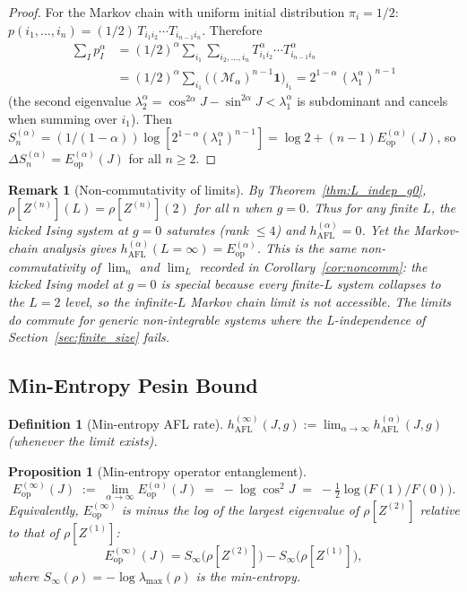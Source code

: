 \documentclass[12pt,a4paper]{article}
\newtheorem{proposition}[theorem]{Proposition}
\newtheorem{definition}[theorem]{Definition}
\newtheorem{remark}[theorem]{Remark}
\begin{document}
\begin{proof}
For the Markov chain with uniform initial distribution $\pi_i=1/2$:
$p(i_1,\ldots,i_n) = (1/2)\,T_{i_1 i_2}\cdots T_{i_{n-1}i_n}$.
Therefore
\begin{align*}
  \sum_I p_I^\alpha
  &= (1/2)^\alpha \sum_{i_1}\sum_{i_2,\ldots,i_n}
    T_{i_1 i_2}^\alpha\cdots T_{i_{n-1}i_n}^\alpha \\
  &= (1/2)^\alpha \sum_{i_1} \bigl((\mathcal{M}_\alpha)^{n-1}\mathbf{1}\bigr)_{i_1}
  = 2^{1-\alpha}\,(\lambda^\alpha_1)^{n-1}
\end{align*}
(the second eigenvalue $\lambda^\alpha_2 = \cos^{2\alpha}\!J - \sin^{2\alpha}\!J < \lambda^\alpha_1$
is subdominant and cancels when summing over $i_1$).
Then $S^{(\alpha)}_n = (1/(1-\alpha))\log[2^{1-\alpha}(\lambda^\alpha_1)^{n-1}]
= \log 2 + (n-1)E^{(\alpha)}_\mathrm{op}(J)$, so
$\Delta S^{(\alpha)}_n = E^{(\alpha)}_\mathrm{op}(J)$ for all $n\ge 2$.
\end{proof}

\begin{remark}[Non-commutativity of limits]
By Theorem~\ref{thm:L_indep_g0}, $\rho[Z^{(n)}](L) = \rho[Z^{(n)}](2)$ for \emph{all}
$n$ when $g=0$.  Thus for any finite $L$, the kicked Ising system at $g=0$ saturates
(rank $\le 4$) and $h^{(\alpha)}_\mathrm{AFL} = 0$.  Yet the Markov-chain analysis gives
$h^{(\alpha)}_\mathrm{AFL}(L=\infty) = E^{(\alpha)}_\mathrm{op}$.
This is the same non-commutativity of $\lim_n$ and $\lim_L$ recorded in
Corollary~\ref{cor:noncomm}: the kicked Ising model at $g=0$ is special because
every finite-$L$ system collapses to the $L=2$ level, so the infinite-$L$ Markov
chain limit is not accessible.  The limits \emph{do} commute for generic non-integrable
systems where the L-independence of Section~\ref{sec:finite_size} fails.
\end{remark}

\subsection{Min-Entropy Pesin Bound}

\begin{definition}[Min-entropy AFL rate]
$h^{(\infty)}_\mathrm{AFL}(J,g) := \lim_{\alpha\to\infty} h^{(\alpha)}_\mathrm{AFL}(J,g)$
(whenever the limit exists).
\end{definition}

\begin{proposition}[Min-entropy operator entanglement]\label{prop:min_entropy_eop}
\begin{equation}\label{eq:Eop_inf}
  E^{(\infty)}_\mathrm{op}(J) \;:=\; \lim_{\alpha\to\infty}E^{(\alpha)}_\mathrm{op}(J)
  \;=\; -\log\cos^2\!J \;=\; -\tfrac{1}{2}\log\bigl(F(1)/F(0)\bigr).
\end{equation}
Equivalently, $E^{(\infty)}_\mathrm{op}$ is minus the log of the largest eigenvalue of
$\rho[Z^{(2)}]$ relative to that of $\rho[Z^{(1)}]$:
\[
  E^{(\infty)}_\mathrm{op}(J)
  = S_\infty\!\bigl(\rho[Z^{(2)}]\bigr) - S_\infty\!\bigl(\rho[Z^{(1)}]\bigr),
\]
where $S_\infty(\rho) = -\log\lambda_\mathrm{max}(\rho)$ is the min-entropy.
\end{proposition}
\end{document}
